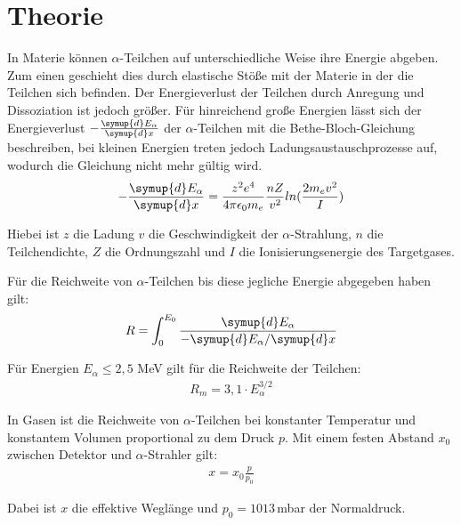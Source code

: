 \section{Theorie}
\label{sec:Theorie}

In Materie können $\alpha$-Teilchen auf unterschiedliche Weise ihre Energie abgeben. Zum einen geschieht dies durch elastische Stöße mit
der Materie in der die Teilchen sich befinden. Der Energieverlust der Teilchen durch Anregung und Dissoziation ist jedoch
größer. Für hinreichend große Energien lässt sich der Energieverlust $-\frac{\symup{d}E_{\alpha}}{\symup{d}x}$ der $\alpha$-Teilchen
mit die Bethe-Bloch-Gleichung beschreiben, bei kleinen Energien treten jedoch Ladungsaustauschprozesse auf, wodurch die Gleichung
nicht mehr gültig wird.
\begin{align}
  -\frac{\symup{d}E_{\alpha}}{\symup{d}x} = \frac{z^2 e^4}{4 \pi \epsilon_0 m_e} \frac{n Z}{v^2} ln(\frac{2 m_e v^2}{I})
\end{align}

Hiebei ist $z$ die Ladung $v$ die Geschwindigkeit der $\alpha$-Strahlung, $n$ die Teilchendichte, $Z$ die Ordnungszahl und $I$ die
Ionisierungsenergie des Targetgases.

Für die Reichweite von $\alpha$-Teilchen bis diese jegliche Energie abgegeben haben gilt:
\begin{align}
  R = \int_0^{E_0} \frac{\symup{d}E_{\alpha}}{-\symup{d}E_{\alpha} / \symup{d}x}
\end{align}

Für Energien $E_{\alpha} \leq 2,5$ MeV gilt für die Reichweite der Teilchen:
\begin{align}
  R_m = 3,1 \cdot E_{\alpha}^{3/2}
\end{align}

In Gasen ist die Reichweite von $\alpha$-Teilchen bei konstanter Temperatur und konstantem Volumen proportional zu dem Druck $p$.
Mit einem festen Abstand $x_0$ zwischen Detektor und $\alpha$-Strahler gilt:
\begin{align}
  x = x_0 \frac{p}{p_0}
\end{align}

Dabei ist $x$ die effektive Weglänge und $p_0 =1013$\,mbar der Normaldruck.
